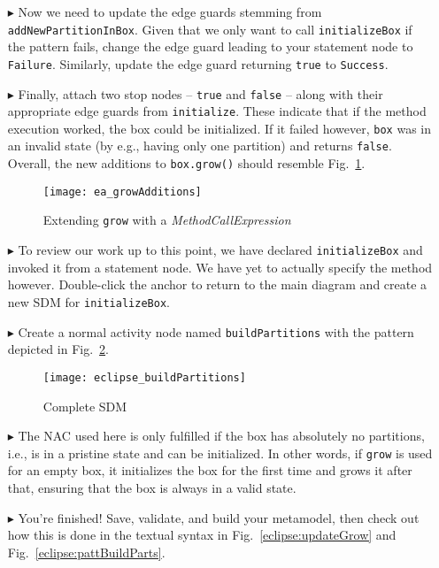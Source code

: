 \begin{itemize}
\clearpage

\item[$\blacktriangleright$] Now we need to update the edge guards stemming from \texttt{add\-New\-Part\-ition\-In\-Box}. Given that we only want to call
\texttt{initializeBox} if the pattern fails, change the edge guard leading to your statement node to \texttt{Failure}. Similarly, update the edge guard
returning \texttt{true} to \texttt{Success}.

\item[$\blacktriangleright$] Finally, attach two stop nodes -- \texttt{true} and \texttt{false} -- along with their appropriate edge guards from
\texttt{initialize}. These indicate that if the method execution worked, the box could be initialized. If it failed however, \texttt{box} was
in an invalid state (by e.g., having only one partition) and returns \texttt{false}. Overall, the new additions to \texttt{box.grow()} should resemble
Fig.~\ref{ea:newGrowControl}.

\vspace{0.5cm}

\begin{figure}[htp]
\begin{center}
  \texttt{[image: ea\_growAdditions]}
  \caption{Extending \texttt{grow} with a \emph{MethodCallExpression}}
  \label{ea:newGrowControl}
\end{center}
\end{figure}

\item[$\blacktriangleright$] To review our work up to this point, we have declared \texttt{initializeBox} and invoked it from a statement node. We have yet
to actually specify the method however. Double-click the anchor to return to the main diagram and create a new SDM
for \texttt{initializeBox}.

\item[$\blacktriangleright$] Create a normal activity node named \texttt{buildPartitions} with the pattern depicted in Fig.~\ref{ea:buildPartitions}.

\newpage
 
\begin{figure}[htp]
\begin{center}
  \texttt{[image: eclipse\_buildPartitions]}
  \caption{Complete SDM}
  \label{ea:buildPartitions}
\end{center}
\end{figure}
 
\item[$\blacktriangleright$] The NAC used here is only fulfilled if the box has absolutely no partitions, i.e., is in a pristine state and can be
initialized. In other words, if \texttt{grow} is used for an empty box, it initializes the box for the first time and grows it after that, ensuring that the box
is always in a valid state.
 
\item[$\blacktriangleright$] You're finished! Save, validate, and build your metamodel, then check out how this is done in the textual syntax in
Fig.~\ref{eclipse:updateGrow} and Fig.~\ref{eclipse:pattBuildParts}.


\end{itemize}
